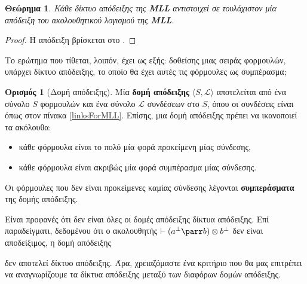\documentclass [a4paper,11pt] {book}
\newtheorem{theorema}[theorem]{Θεώρημα}
\theoremstyle{definition}
\theoremstyle{definition}
\newtheorem{definition}[theorem]{Ορισμός}
\begin{document}
\begin{theorema}
Κάθε δίκτυο απόδειξης της \textbf{MLL} αντιστοιχεί σε τουλάχιστον μία απόδειξη του ακολουθητικού λογισμού της \textbf{MLL}.
\end{theorema}
\begin{proof}
Η απόδειξη βρίσκεται στο \citep{Retore:2003:HPP:763666.763673}.
\end{proof}
Το ερώτημα που τίθεται, λοιπόν, έχει ως εξής: δοθείσης μιας σειράς φορμουλών, υπάρχει δίκτυο απόδειξης, το οποίο θα έχει αυτές τις φόρμουλες ως συμπέρασμα;

\begin{definition}[Δομή απόδειξης]
Μία \textbf{δομή απόδειξης} $\langle S,\mathcal{L}\rangle$ αποτελείται από ένα σύνολο $S$ φορμουλών και ένα σύνολο $\mathcal{L}$ συνδέσεων στο $S$, όπου οι συνδέσεις είναι όπως στον πίνακα \ref{linksForMLL}. Επίσης, μια δομή απόδειξης πρέπει να ικανοποιεί τα ακόλουθα:
\begin{itemize}
\item κάθε φόρμουλα είναι το πολύ μία φορά προκείμενη μίας σύνδεσης,
\item κάθε φόρμουλα είναι ακριβώς μία φορά συμπέρασμα μίας σύνδεσης.
\end{itemize}
Οι φόρμουλες που δεν είναι προκείμενες καμίας σύνδεσης λέγονται \textbf{συμπεράσματα} της δομής απόδειξης.
\end{definition}
Είναι προφανές ότι δεν είναι όλες οι δομές απόδειξης δίκτυα απόδειξης. Επί παραδείγματι, δεδομένου ότι ο ακολουθητής $\vdash(a^{\bot}\parr b)\otimes b^{\bot}$ δεν είναι αποδείξιμος, η δομή απόδειξης
\begin{center}
\end{center}
δεν αποτελεί δίκτυο απόδειξης. Άρα, χρειαζόμαστε ένα κριτήριο που θα μας επιτρέπει να αναγνωρίζουμε τα δίκτυα απόδειξης μεταξύ των διαφόρων δομών απόδειξης.
\end{document}
